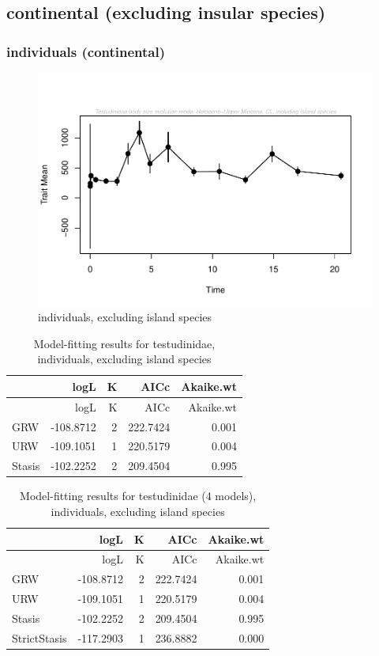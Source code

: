 \documentclass[]{article}
\begin{document}
\newpage

\subsection{continental (excluding insular
species)}\label{continental-excluding-insular-species}

\subsubsection{individuals (continental)}\label{individuals-continental}

\begin{figure}[htbp]
\centering
\includegraphics{MA_JJ_files/figure-latex/paleoTS, individuals, exluding island species-1.pdf}
\caption{individuals, excluding island species}
\end{figure}

\begin{longtable}[]{@{}lrrrr@{}}
\caption{Model-fitting results for testudinidae, individuals, excluding
island species}\tabularnewline
\toprule
& logL & K & AICc & Akaike.wt\tabularnewline
\midrule
\endfirsthead
\toprule
& logL & K & AICc & Akaike.wt\tabularnewline
\midrule
\endhead
GRW & -108.8712 & 2 & 222.7424 & 0.001\tabularnewline
URW & -109.1051 & 1 & 220.5179 & 0.004\tabularnewline
Stasis & -102.2252 & 2 & 209.4504 & 0.995\tabularnewline
\bottomrule
\end{longtable}

\begin{longtable}[]{@{}lrrrr@{}}
\caption{Model-fitting results for testudinidae (4 models), individuals,
excluding island species}\tabularnewline
\toprule
& logL & K & AICc & Akaike.wt\tabularnewline
\midrule
\endfirsthead
\toprule
& logL & K & AICc & Akaike.wt\tabularnewline
\midrule
\endhead
GRW & -108.8712 & 2 & 222.7424 & 0.001\tabularnewline
URW & -109.1051 & 1 & 220.5179 & 0.004\tabularnewline
Stasis & -102.2252 & 2 & 209.4504 & 0.995\tabularnewline
StrictStasis & -117.2903 & 1 & 236.8882 & 0.000\tabularnewline
\bottomrule
\end{longtable}
\end{document}
